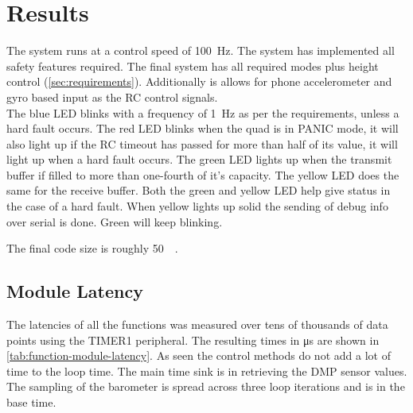 \documentclass[final]{article}
\begin{document}
\section{Results}



The system runs at a control speed of \SI{100}{\hertz}.
The system has implemented all safety features required.
The final system has all required modes plus height control (\cref{sec:requirements}).
Additionally is allows for phone accelerometer and gyro based input as the RC control signals.\\
The blue LED blinks with a frequency of \SI{1}{\hertz} as per the requirements, unless a hard fault occurs.
The red LED blinks when the quad is in PANIC mode, it will also light up if the RC timeout has passed for more than half of its value, it will light up when a hard fault occurs.
The green LED lights up when the transmit buffer if filled to more than one-fourth of it's capacity.
The yellow LED does the same for the receive buffer.
Both the green and yellow LED help give status in the case of a hard fault.
When yellow lights up solid the sending of debug info over serial is done.
Green will keep blinking.

The final code size is roughly \SI{50}{\kilo\byte}.



\subsection{Module Latency}
\label{ssec:module-latency}
The latencies of all the functions was measured over tens of thousands of data points using the TIMER1 peripheral.
The resulting times in \si{\micro\second} are shown in \cref{tab:function-module-latency}.
As seen the control methods do not add a lot of time to the loop time.
The main time sink is in retrieving the DMP sensor values.
The sampling of the barometer is spread across three loop iterations and is in the base time.
\end{document}
